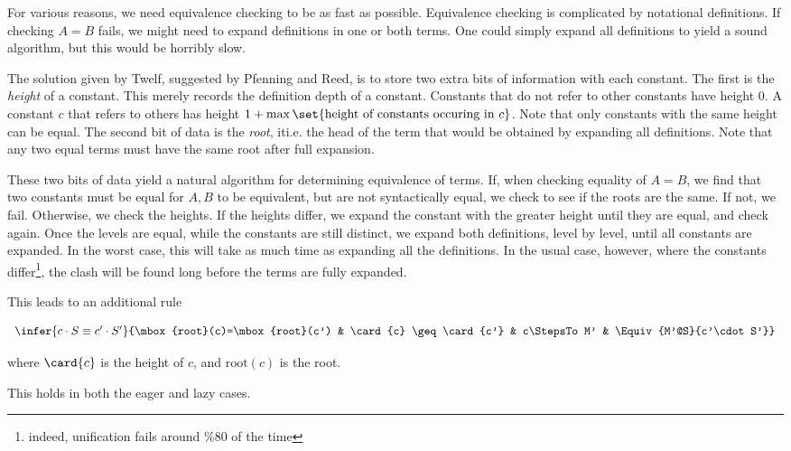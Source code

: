   For various reasons, we need equivalence checking to
be as fast as possible.  Equivalence checking is complicated
by notational definitions.  If checking $A=B$ fails, we might need
to expand definitions in one or both terms.  One could simply
expand all definitions to yield a sound algorithm, but this would
be horribly slow.  

  The solution given by Twelf, suggested by 
Pfenning and Reed, is to store two extra bits of information 
with each constant.  The first is the \emph{height} of a constant.
This merely records the definition depth of a constant.  Constants that
do not refer to other constants have height 0.  A constant $c$ that refers
to others has height $1 + \max\set{\mbox{height of constants occuring in } c}$.
Note that only constants with the same height can be equal.  
The second bit of data is the \emph{root}, it{i.e.} the head of the term that would be obtained by 
expanding all definitions.  Note that any two equal terms must have the
same root after full expansion. 

These two bits of data yield a natural algorithm for determining 
equivalence of terms.  If, when checking equality of $A=B$,
we find that two constants must be equal for $A,B$ to
be equivalent, but are not syntactically equal, 
we check to see if the roots are the same.
If not, we fail.  Otherwise, we check the heights.  If the heights
differ, we expand the constant with the greater height until 
they are equal, and check again.  Once the levels
are equal, while the constants are still distinct, we 
expand both definitions, level by level, until all constants
are expanded.  In the worst case, this will take as much time
as expanding all the definitions.  In the usual case, however,
where the constants differ\footnote{indeed, unification fails
around \%80 of the time}, the clash will be found long before
the terms are fully expanded.  

This leads to an additional rule 

\newcommand{\Root}{\mbox{root}}
$$
\begin{array}{cccc}
\infer{\Equiv{c\cdot S}{c'\cdot S'}}{\Root(c)=\Root(c') & \card{c} \geq \card{c'} & c\StepsTo M' & \Equiv{M'@S}{c'\cdot S'}} 
\end{array} 
$$

where $\card{c}$ is the height of $c$, and $\Root(c)$ is the root.

This holds in both the eager and lazy cases.

